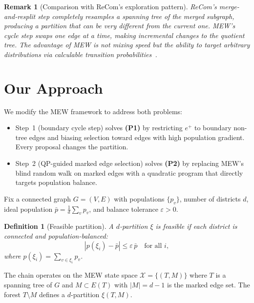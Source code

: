 \documentclass[11pt]{article}
\newtheorem{definition}{Definition}[section]
\newtheorem{remark}{Remark}[section]
\newcommand{\pbar}{\bar{p}}
\begin{document}
\begin{remark}[Comparison with ReCom's exploration pattern]
ReCom's merge-and-resplit step completely resamples a spanning tree of the
merged subgraph, producing a partition that can be very different from the
current one. MEW's cycle step swaps one edge at a time, making incremental
changes to the quotient tree.
The advantage of MEW is not mixing speed but the ability to target arbitrary
distributions via calculable transition probabilities~\cite{mew}.
\end{remark}


\section{Our Approach}\label{sec:algorithm}

We modify the MEW framework to address both problems:
\begin{itemize}
  \item Step~1 (boundary cycle step) solves \textbf{(P1)} by restricting
    $e^+$ to boundary non-tree edges and biasing selection toward edges with
    high population gradient. Every proposal changes the partition.
  \item Step~2 (QP-guided marked edge selection) solves \textbf{(P2)} by
    replacing MEW's blind random walk on marked edges with a quadratic program
    that directly targets population balance.
\end{itemize}

Fix a connected graph $G = (V, E)$ with populations $\{p_v\}$, number of
districts $d$, ideal population $\pbar = \frac{1}{d}\sum_v p_v$, and balance
tolerance $\varepsilon > 0$.

\begin{definition}[Feasible partition]\label{def:feasible}
A $d$-partition $\xi$ is \emph{feasible} if each district is connected and
population-balanced:
\[
  |p(\xi_i) - \pbar| \leq \varepsilon \, \pbar \quad \text{for all } i,
\]
where $p(\xi_i) = \sum_{v \in \xi_i} p_v$.
\end{definition}

The chain operates on the MEW state space $\mathcal{X} = \{(T, M)\}$ where
$T$ is a spanning tree of $G$ and $M \subset E(T)$ with $|M| = d - 1$ is the
marked edge set. The forest $T \setminus M$ defines a $d$-partition
$\xi(T, M)$.
\end{document}
